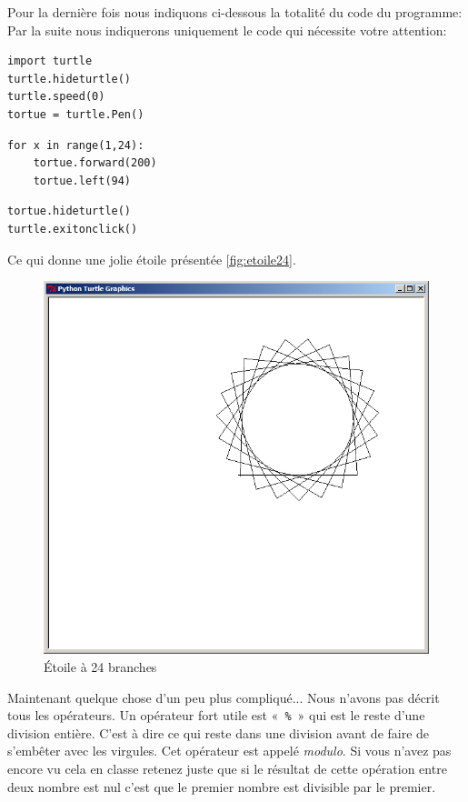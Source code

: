 Pour la dernière fois nous indiquons ci-dessous la totalité du code du programme: Par la suite nous indiquerons uniquement le code qui nécessite votre attention:
\begin{Verbatim}[frame=single,rulecolor=\color{mbleu}, label=ne sera plus rappelé]
import turtle
turtle.hideturtle()
turtle.speed(0)
tortue = turtle.Pen()
\end{Verbatim}
\begin{Verbatim}[frame=single,rulecolor=\color{mbleu}, label= à taper]
for x in range(1,24):
	tortue.forward(200)
	tortue.left(94)
\end{Verbatim}
\begin{Verbatim}[frame=single,rulecolor=\color{mbleu}, label=ne sera plus rappelé]
tortue.hideturtle()
turtle.exitonclick()
\end{Verbatim}
 
Ce qui donne une jolie étoile présentée \autoref{fig:etoile24}.
\begin{figure}[H]
\centering
\includegraphics[scale=0.4]{images/etoile24}
\caption{Étoile à 24 branches}\label{fig:etoile24}
\end{figure}

Maintenant quelque chose d'un peu plus compliqué... Nous n'avons pas décrit tous les opérateurs. Un opérateur fort utile est « \texttt{\%} » qui est le reste d'une division entière. C'est à dire ce qui reste dans une division avant de faire de s'embêter avec les virgules. Cet opérateur est appelé \emph{modulo}. Si vous n'avez pas encore vu cela en classe retenez juste que si le résultat de cette opération entre deux nombre est nul c'est que le premier nombre est divisible par le premier.

